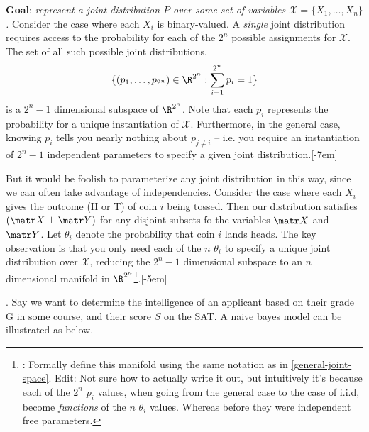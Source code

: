 \documentclass[11pt]{article}
\newcommand\myspace[1][]{\vspace{#1\bigskipamount}}
\newcommand\p{\Needspace{10\baselineskip} \noindent}
\begin{document}
\p \textbf{Goal}: \textit{represent a joint distribution $P$ over some set of variables $\mathcal{X} = \{X_1, \ldots, X_n\}$.} Consider the case where each $X_i$ is binary-valued. A \textit{single} joint distribution requires access to the probability for each of the $2^n$ possible assignments for $\mathcal{X}$. The set of all such possible joint distributions,
\begin{align}
	\{ (p_1, \ldots, p_{2^n}) \in \R^{2^n} : \sum_{i = 1}^{2^n} p_i = 1   \label{general-joint-space}  \}
\end{align}
is a $2^n - 1$ dimensional subspace of $\R^{2^n}$. Note that each $p_i$ represents the probability for a unique instantiation of $\mathcal{X}$. Furthermore, in the general case, knowing $p_i$ tells you nearly nothing about $p_{j \ne i}$ -- i.e. you require an instantiation of $2^{n} - 1$ independent parameters to specify a given joint distribution.[-7em] 

But it would be foolish to parameterize any joint distribution in this way, since we can often take advantage of independencies. Consider the case where each $X_i$ gives the outcome (H or T) of coin $i$ being tossed. Then our distribution satisfies $(\matr X \perp \matr Y)$ for any disjoint subsets fo the variables $\matr X$ and $\matr Y$. Let $\theta_i$ denote the probability that coin $i$ lands heads. The key observation is that you only need each of the $n$ $\theta_i$ to specify a unique joint distribution over $\mathcal{X}$, reducing the $2^{n} - 1$ dimensional subspace to an $n$ dimensional manifold in $\R^{2^n}$\footnote{: Formally define this manifold using the same notation as in \ref{general-joint-space}. Edit: Not sure how to actually write it out, but intuitively it's because each of the $2^n$ $p_i$ values, when going from the general case to the case of i.i.d, become \textit{functions} of the $n$ $\theta_i$ values. Whereas before they were independent free parameters.}.[-5em] 


\myspace
\p {}. Say we want to determine the intelligence of an applicant based on their grade G in some course, and their score $S$ on the SAT. A naive bayes model can be illustrated as below. 
\end{document}
